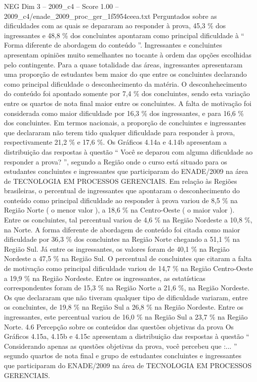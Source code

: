 \begin{textsample}{NEG Dim 3 – 2009\_c4 – Score 1.00 – 2009\_c4/enade\_2009\_proc\_ger\_1f5954ceea.txt}
Perguntados sobre as dificuldades com as quais se depararam ao responder à prova, 45,3 \% dos ingressantes e 48,8 \% dos concluintes apontaram como principal dificuldade à “ Forma diferente de abordagem do conteúdo ”.
Ingressantes e concluintes apresentam opiniões muito semelhantes no tocante à ordem das opções escolhidas pelo contingente.
Para a quase totalidade das áreas, ingressantes apresentaram uma proporção de estudantes bem maior do que entre os concluintes declarando como principal dificuldade o desconhecimento da matéria.
O desconhehecimento do conteúdo foi apontado somente por 7,4 \% dos concluintes, sendo esta variação entre os quartos de nota final maior entre os concluintes.
A falta de motivação foi considerada como maior dificuldade por 16,3 \% dos ingressantes, e para 16,6 \% dos concluintes.
Em termos nacionais, a proporção de concluintes e ingressantes que declararam não terem tido qualquer dificuldade para responder à prova, respectivamente 21,2 \% e 17,6 \%.
Os Gráficos 4.14a e 4.14b apresentam a distribuição das respostas à questão “ Você se deparou com alguma dificuldade ao responder a prova? ”, segundo a Região onde o curso está situado para os estudantes concluintes e ingressantes que participaram do ENADE/2009 na área de TECNOLOGIA EM PROCESSOS GERENCIAIS.
Em relação às Regiões brasileiras, o percentual de ingressantes que apontaram o desconhecimento do conteúdo como principal dificuldade ao responder à prova variou de 8,5 \% na Região Norte ( o menor valor ), a 18,6 \% na Centro-Oeste ( o maior valor ).
Entre os concluintes, tal percentual variou de 4,6 \% na Região Nordeste a 10,8 \%, na Norte.
A forma diferente de abordagem de conteúdo foi citada como maior dificuldade por 36,3 \% dos concluintes na Região Norte chegando a 51,1 \% na Região Sul.
Já entre os ingressantes, os valores foram de 40,1 \% na Região Nordeste a 47,5 \% na Região Sul.
O percentual de concluintes que citaram a falta de motivação como principal dificuldade variou de 14,7 \% na Região Centro-Oeste a 19,9 \% na Região Nordeste.
Entre os ingressantes, as estatísticas correspondentes foram de 15,3 \% na Região Norte a 21,6 \%, na Região Nordeste.
Os que declararam que não tiveram qualquer tipo de dificuldade variaram, entre os concluintes, de 19,8 \% na Região Sul a 26,8 \% na Região Nordeste.
Entre os ingressantes, este percentual variou de 16,0 \% na Região Sul a 23,7 \% na Região Norte. 4.6 Percepção sobre os conteúdos das questões objetivas da prova Os Gráficos 4.15a, 4.15b e 4.15c apresentam a distribuição das respostas à questão “ Considerando apenas as questões objetivas da prova, você percebeu que :... ” segundo quartos de nota final e grupo de estudantes concluintes e ingressantes que participaram do ENADE/2009 na área de TECNOLOGIA EM PROCESSOS GERENCIAIS.

\end{textsample}
